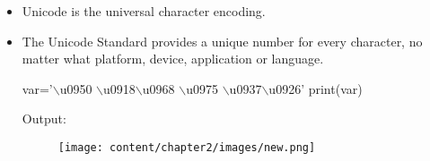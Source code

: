 
\begin{flushleft}
	
	\begin{itemize}
		\item Unicode is the universal character encoding.
		\item The Unicode Standard provides a unique number for every character, no matter what platform, device, application or language. 
		
		\begin{tcolorbox}[breakable,notitle,boxrule=-0pt,colback=code,colframe=code]
			\color{white}
			\font=8pt
			var='$\backslash$u0950 $\backslash$u0918$\backslash$u0968 $\backslash$u0975 $\backslash$u0937$\backslash$u0926' \newline
			print(var)
			\font=4pt
		\end{tcolorbox}
		
		Output:
		\begin{figure}[h!]
			\centering
			\texttt{[image: content/chapter2/images/new.png]}
		\end{figure}
		
		
	\end{itemize}
		


		
\end{flushleft}

\newpage

